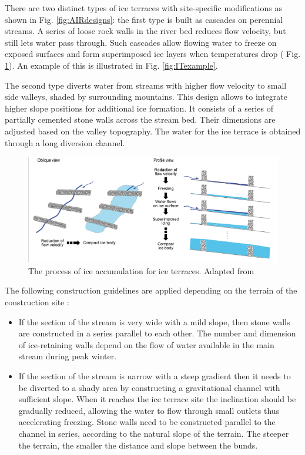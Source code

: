 There are two distinct types of ice terraces with site-specific modifications as shown in Fig.
\ref{fig:AIRdesigns}: the first type is built as cascades on perennial streams. A series of loose rock walls in
the river bed reduces flow velocity, but still lets water pass through. Such cascades allow flowing water to
freeze on exposed surfaces and form superimposed ice layers when temperatures drop ( Fig.
\ref{fig:ITscience}). An example of this is illustrated in Fig. \ref{fig:ITexample}.

The second type diverts water from streams with higher flow velocity to small side valleys, shaded by
surrounding mountains. This design allows to integrate higher slope positions for additional ice formation. It
consists of a series of partially cemented stone walls across the stream bed. Their dimensions are adjusted
based on the valley topography. The water for the ice terrace is obtained through a long diversion channel.

\begin{figure}[htb]
\centering
\includegraphics[width=\textwidth]{figs/IT_science.png}

\caption{ The process of ice accumulation for ice terraces. Adapted from
\citet{nusserSociohydrologyArtificialGlaciers2019}}

\label{fig:ITscience}
\end{figure}

The following construction guidelines are applied depending on the terrain of the construction site
\citep{norphelSnowWaterHarvesting2015}:

\begin{itemize}

  \item If the section of the stream is very wide with a mild slope, then stone walls are
    constructed in a series parallel to each other. The number and dimension of ice-retaining walls depend on
    the flow of water available in the main stream during peak winter.

  \item If the section of the stream is narrow with a steep gradient then it needs to be diverted to a shady area
    by constructing a gravitational channel with sufficient slope. When it reaches the ice terrace site the
    inclination should be gradually reduced, allowing the water to flow through small outlets thus accelerating freezing. Stone
    walls need to be constructed parallel to the channel in series, according to the natural slope of the terrain.
    The steeper the terrain, the smaller the distance and slope between the bunds.

\end{itemize}


